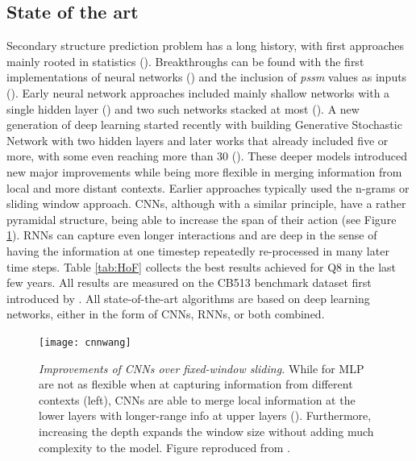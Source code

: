 \subsection{State of the art}
Secondary structure prediction problem has a long history, with first approaches mainly rooted in statistics (\cite{Chou1974}). Breakthroughs can be found with the first implementations of neural networks (\cite{Qian1988}) and the inclusion of \textit{pssm} values as inputs (\cite{Rost1993}). Early neural network approaches included mainly shallow networks with a single hidden layer (\cite{Qian1988,doi:10.1016/0014-5793(88)81066-4,Rost1993}) and two such networks stacked at most (\cite{Jones1999,Dor2007}). A new generation of deep learning started recently with \cite{Zhou2014} building Generative Stochastic Network with two hidden layers and later works that already included five or more, with some even reaching more than 30 (\cite{8371925,Fang2017}). These deeper models introduced new major improvements while being more flexible in merging information from local and more distant contexts. Earlier approaches typically used the n-grams or sliding window approach. CNNs, although with a similar principle, have a rather pyramidal structure, being able to increase the span of their action (see Figure \ref{fig:cnnwang}). RNNs can capture even longer interactions and are deep in the sense of having the information at one timestep repeatedly re-processed in many later time steps. Table \ref{tab:HoF} collects the best results achieved for Q8 in the last few years. All results are measured on the CB513 benchmark dataset first introduced by \cite{Zhou2014}. All state-of-the-art algorithms are based on deep learning networks, either in the form of CNNs, RNNs, or both combined.

\begin{figure}
	\centering
	\texttt{[image: cnnwang]}
	\caption{\textit{Improvements of CNNs over fixed-window sliding.} While for MLP are not as flexible when at capturing information from different contexts (left), CNNs are able to merge local information at the lower layers with longer-range info at upper layers (\cite{Busia2017}). Furthermore, increasing the depth expands the window size without adding much complexity to the model. Figure reproduced from \cite{Wang2016}.}
	\label{fig:cnnwang}
\end{figure}

